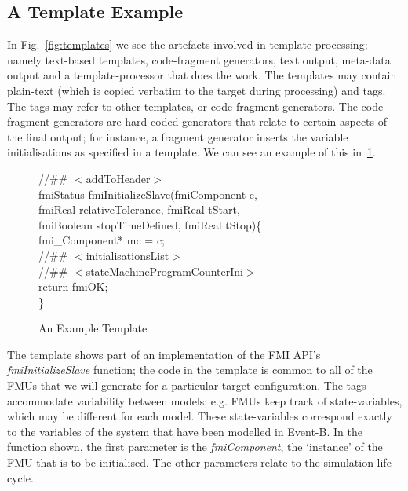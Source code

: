 \documentclass{llncs}%
\begin{document}
\subsection{A Template Example}
In Fig.~\ref{fig:templates} we see the artefacts involved in template processing; namely text-based templates, code-fragment generators, text output, meta-data output and a template-processor that does the work. The templates may contain plain-text (which is copied verbatim to the target during processing) and tags. The tags may refer to other templates, or code-fragment generators. The code-fragment generators are hard-coded generators that relate to certain aspects of the final output; for instance, a fragment generator inserts the variable initialisations as specified in a template. We can see an example of this in~\ref{fig:templateExample}. 
%
\begin{figure}
\begin{center}
\begin{minipage}{0.8\textwidth}
//\#\# $<$addToHeader$>$\\
fmiStatus fmiInitializeSlave(fmiComponent c,\\
\hspace*{0.2cm}fmiReal relativeTolerance, fmiReal tStart,\\
\hspace*{0.2cm}fmiBoolean stopTimeDefined, fmiReal tStop)\{\\
\hspace*{0.4cm}fmi\_Component* mc = c;\\
\hspace*{0.4cm}//\#\# $<$initialisationsList$>$\\
\hspace*{0.4cm}//\#\# $<$stateMachineProgramCounterIni$>$\\
\hspace*{0.4cm}return fmiOK;\\
\}
\end{minipage}
\end{center}
\caption{An Example Template}
\label{fig:templateExample}
\end{figure}
%
%
The template shows part of an implementation of the FMI API's \emph{fmiInitializeSlave} function; the code in the template is common to all of the FMUs that we will generate for a particular target configuration. The tags accommodate variability between models; e.g. FMUs keep track of state-variables, which may be different for each model. These state-variables correspond exactly to the variables of the system that have been modelled in Event-B. In the function shown, the first parameter is the \emph{fmiComponent}, the `instance' of the FMU that is to be initialised. The other parameters relate to the simulation life-cycle.  
\end{document}
